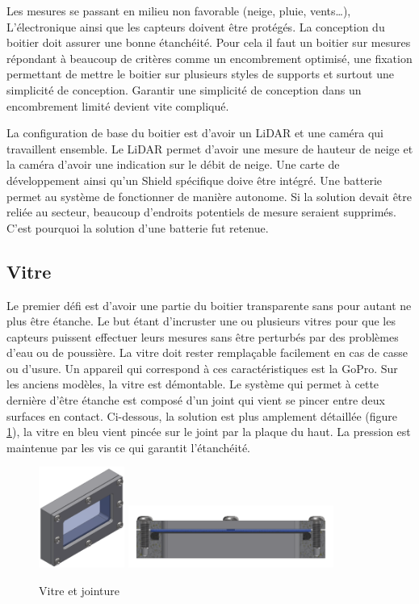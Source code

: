 Les mesures se passant en milieu non favorable (neige, pluie, vents…), L’électronique ainsi que les capteurs 
doivent être protégés. La conception du boitier doit assurer une bonne étanchéité. Pour cela il faut un 
boitier sur mesures répondant à beaucoup de critères comme un encombrement optimisé, une fixation permettant 
de mettre le boitier sur plusieurs styles de supports et surtout une simplicité de conception. Garantir une 
simplicité de conception dans un encombrement limité devient vite compliqué. \par
La configuration de base du boitier est d’avoir un LiDAR et une caméra qui travaillent ensemble. Le LiDAR 
permet d’avoir une mesure de hauteur de neige et la caméra d’avoir une indication sur le débit de neige. 
Une carte de développement ainsi qu’un Shield spécifique doive être intégré. Une batterie permet au système 
de fonctionner de manière autonome. Si la solution devait être reliée au secteur, beaucoup d’endroits potentiels 
de mesure seraient supprimés. C’est pourquoi la solution d’une batterie fut retenue. 

\subsection{Vitre}

Le premier défi est d’avoir une partie du boitier transparente sans pour autant ne plus être étanche. Le but 
étant d’incruster une ou plusieurs vitres pour que les capteurs puissent effectuer leurs mesures sans être 
perturbés par des problèmes d’eau ou de poussière. La vitre doit rester remplaçable facilement en cas de 
casse ou d’usure. Un appareil qui correspond à ces caractéristiques est la GoPro. Sur les anciens modèles, 
la vitre est démontable. Le système qui permet à cette dernière d’être étanche est composé d’un joint qui 
vient se pincer entre deux surfaces en contact. Ci-dessous, la solution est plus amplement détaillée (figure \ref{fig:vitre}), 
la vitre en bleu vient pincée sur le joint par la plaque du haut. La pression est maintenue par les vis ce 
qui garantit l’étanchéité.

\begin{figure}[H]
    \centering
    \includegraphics[width=0.25\textwidth]{Images/photos_PGA/vitreInv.PNG}
    \includegraphics[width=0.6\textwidth]{Images/photos_PGA/vitreJoint.PNG}
    \caption{Vitre et jointure}
    \label{fig:vitre}
\end{figure}


